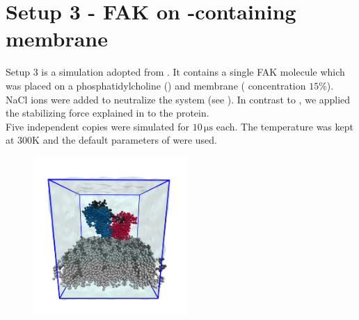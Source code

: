 \section{Setup 3 - FAK on \pip{}-containing membrane}
\label{setup:setup3}
Setup 3 is a \martini{} simulation adopted from \textcite{sara}. It contains a single FAK molecule which was placed on a phosphatidylcholine (\popc{}) and \pip{} membrane (\pip{} concentration $15\%$). NaCl ions were added to neutralize the system (see ). In contrast to \textcite{sara}, we applied the stabilizing force explained in  to the protein.\\
Five independent copies were simulated for $10\,\si{\micro\second}$ each. The temperature was kept at $300\si{\kelvin}$ and the default parameters of \martini{} were used.
%
%
%
\begin{figure}[h]
	\centering
	\includegraphics[height=6cm]{figures/setup/setup_gen}
	\label{setup:setup3_pic}
\end{figure}
%
%
%
